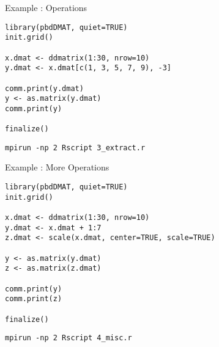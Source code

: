 \begin{frame}[fragile]
  \begin{exampleblock}{Example \countex:   Operations}\pause
\begin{lstlisting}[title=Generate locally only what is needed]
library(pbdDMAT, quiet=TRUE)
init.grid()

x.dmat <- ddmatrix(1:30, nrow=10)
y.dmat <- x.dmat[c(1, 3, 5, 7, 9), -3]

comm.print(y.dmat)
y <- as.matrix(y.dmat)
comm.print(y)

finalize()
\end{lstlisting}
\begin{lstlisting}[basicstyle=\tiny,backgroundcolor=\color{white},keywordstyle=\color{black},
title=\fontsize{6pt}{7.2}\selectfont Execute this script via:]
mpirun -np 2 Rscript 3_extract.r
\end{lstlisting} 
  \end{exampleblock}
\end{frame}



\begin{frame}[fragile]
  \begin{exampleblock}{Example \countex:  More  Operations}\pause
\begin{lstlisting}
library(pbdDMAT, quiet=TRUE)
init.grid()

x.dmat <- ddmatrix(1:30, nrow=10)
y.dmat <- x.dmat + 1:7
z.dmat <- scale(x.dmat, center=TRUE, scale=TRUE)

y <- as.matrix(y.dmat)
z <- as.matrix(z.dmat)

comm.print(y)
comm.print(z)

finalize()
\end{lstlisting}
\begin{lstlisting}[basicstyle=\tiny,backgroundcolor=\color{white},keywordstyle=\color{black},
title=\fontsize{6pt}{7.2}\selectfont Execute this script via:]
mpirun -np 2 Rscript 4_misc.r
\end{lstlisting} 
  \end{exampleblock}
\end{frame}

